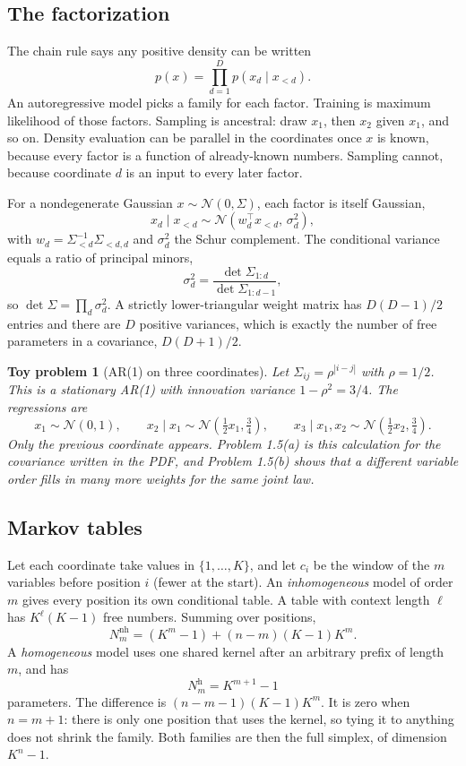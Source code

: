 \documentclass[11pt]{article}
\newtheorem{toy}{Toy problem}
\theoremstyle{remark}
\newcommand{\N}{\mathcal{N}}
\begin{document}
\subsection{The factorization}

The chain rule says any positive density can be written
\[
p(x)=\prod_{d=1}^D p(x_d\mid x_{<d}).
\]
An autoregressive model picks a family for each factor. Training is maximum likelihood of those factors. Sampling is ancestral: draw \(x_1\), then \(x_2\) given \(x_1\), and so on. Density evaluation can be parallel in the coordinates once \(x\) is known, because every factor is a function of already-known numbers. Sampling cannot, because coordinate \(d\) is an input to every later factor.

For a nondegenerate Gaussian \(x\sim\N(0,\Sigma)\), each factor is itself Gaussian,
\[
x_d\mid x_{<d}\sim\N(w_d^\top x_{<d},\,\sigma_d^2),
\]
with \(w_d=\Sigma_{<d}^{-1}\Sigma_{<d,d}\) and \(\sigma_d^2\) the Schur complement. The conditional variance equals a ratio of principal minors,
\[
\sigma_d^2=\frac{\det\Sigma_{1:d}}{\det\Sigma_{1:d-1}},
\]
so \(\det\Sigma=\prod_d\sigma_d^2\). A strictly lower-triangular weight matrix has \(D(D-1)/2\) entries and there are \(D\) positive variances, which is exactly the number of free parameters in a covariance, \(D(D+1)/2\).

\begin{toy}[AR(1) on three coordinates]
Let \(\Sigma_{ij}=\rho^{|i-j|}\) with \(\rho=1/2\). This is a stationary AR(1) with innovation variance \(1-\rho^2=3/4\). The regressions are
\[
x_1\sim\N(0,1),\qquad
x_2\mid x_1\sim\N(\tfrac12 x_1,\tfrac34),\qquad
x_3\mid x_1,x_2\sim\N(\tfrac12 x_2,\tfrac34).
\]
Only the previous coordinate appears. Problem 1.5(a) is this calculation for the covariance written in the PDF, and Problem 1.5(b) shows that a different variable order fills in many more weights for the same joint law.
\end{toy}

\subsection{Markov tables}
\label{sec:markov}

Let each coordinate take values in \(\{1,\ldots,K\}\), and let \(c_i\) be the window of the \(m\) variables before position \(i\) (fewer at the start). An \emph{inhomogeneous} model of order \(m\) gives every position its own conditional table. A table with context length \(\ell\) has \(K^\ell(K-1)\) free numbers. Summing over positions,
\[
N_m^{\mathrm{nh}}
=(K^m-1)+(n-m)(K-1)K^m.
\]
A \emph{homogeneous} model uses one shared kernel after an arbitrary prefix of length \(m\), and has
\[
N_m^{\mathrm{h}}=K^{m+1}-1
\]
parameters. The difference is \((n-m-1)(K-1)K^m\). It is zero when \(n=m+1\): there is only one position that uses the kernel, so tying it to anything does not shrink the family. Both families are then the full simplex, of dimension \(K^n-1\).
\end{document}
